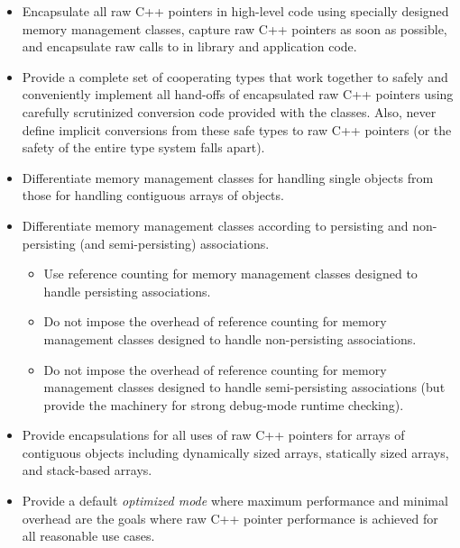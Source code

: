 \documentclass[pdf,ps2pdf,11pt]{SANDreport}
\begin{document}
\begin{itemize}

{}\item Encapsulate all raw C++ pointers in high-level code using
specially designed memory management classes, capture raw C++ pointers
as soon as possible, and encapsulate raw calls to {} in
library and application code.

{}\item Provide a complete set of cooperating types that work together
to safely and conveniently implement all hand-offs of encapsulated raw
C++ pointers using carefully scrutinized conversion code provided with
the classes.  Also, never define implicit conversions from these safe
types to raw C++ pointers (or the safety of the entire type system
falls apart).

{}\item Differentiate memory management classes for handling single
objects from those for handling contiguous arrays of objects.

{}\item Differentiate memory management classes according to
persisting and non-persisting (and semi-persisting) associations.

  \begin{itemize}

  {}\item Use reference counting for memory management classes
  designed to handle persisting associations.

  {}\item Do not impose the overhead of reference counting for memory
  management classes designed to handle non-persisting associations.

  {}\item Do not impose the overhead of reference counting for memory
  management classes designed to handle semi-persisting associations
  (but provide the machinery for strong debug-mode runtime checking).

  \end{itemize}

{}\item Provide encapsulations for all uses of raw C++ pointers for
arrays of contiguous objects including dynamically sized arrays,
statically sized arrays, and stack-based arrays.

{}\item Provide a default {}\textit{optimized mode} where maximum
performance and minimal overhead are the goals where raw C++ pointer
performance is achieved for all reasonable use cases.


\end{itemize}
\end{document}
